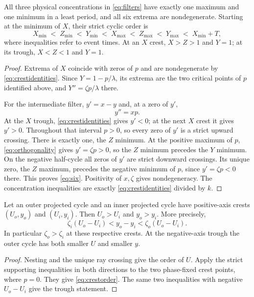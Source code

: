 \begin{theorem}\label{thm:six}
All three physical concentrations in \eqref{eq:filters} have exactly one maximum and one minimum in a least period, and all six extrema are nondegenerate. Starting at the minimum of $X$, their strict cyclic order is
\begin{equation}\label{eq:six}
X_{\min}\;<\;Z_{\min}\;<\;Y_{\min}\;<\;
X_{\max}\;<\;Z_{\max}\;<\;Y_{\max}\;<\;X_{\min}+T,
\end{equation}
where inequalities refer to event times. At an $X$ crest, $X>Z>1$ and $Y=1$; at its trough, $X<Z<1$ and $Y=1$.
\end{theorem}
\begin{proof}
Extrema of $X$ coincide with zeros of $p$ and are nondegenerate by \eqref{eq:crestidentities}. Since $Y=1-p/\lambda$, its extrema are the two critical points of $p$ identified above, and $Y''=\zeta p/\lambda$ there.

For the intermediate filter, $y'=x-y$ and, at a zero of $y'$,
\[
y''=xp.
\]
At the $X$ trough, \eqref{eq:crestidentities} gives $y'<0$; at the next $X$ crest it gives $y'>0$. Throughout that interval $p>0$, so every zero of $y'$ is a strict upward crossing. There is exactly one, the $Z$ minimum. At the positive maximum of $p$, \eqref{eq:orthogonality} gives $y'=\zeta p>0$, so the $Z$ minimum precedes the $Y$ minimum. On the negative half-cycle all zeros of $y'$ are strict downward crossings. Its unique zero, the $Z$ maximum, precedes the negative minimum of $p$, since $y'=\zeta p<0$ there. This proves \eqref{eq:six}. Positivity of $x,\zeta$ gives nondegeneracy. The concentration inequalities are exactly \eqref{eq:crestidentities} divided by $k$.
\end{proof}

\begin{corollary}\label{cor:orderedcrests}
Let an outer projected cycle and an inner projected cycle have positive-axis crests $(U_o,y_o)$ and $(U_i,y_i)$. Then $U_o>U_i$ and $y_o>y_i$. More precisely,
\begin{equation}\label{eq:crestorder}
\zeta_i(U_o-U_i)<y_o-y_i<\zeta_o(U_o-U_i).
\end{equation}
In particular $\zeta_o>\zeta_i$ at these respective crests. At the negative-axis trough the outer cycle has both smaller $U$ and smaller $y$.
\end{corollary}
\begin{proof}
Nesting and the unique ray crossing give the order of $U$. Apply the strict supporting inequalities in both directions to the two phase-fixed crest points, where $p=0$. They give \eqref{eq:crestorder}. The same two inequalities with negative $U_o-U_i$ give the trough statement.
\end{proof}

